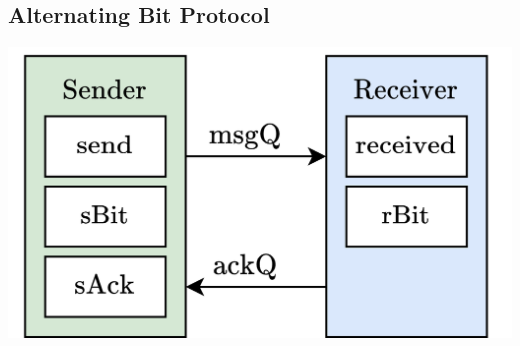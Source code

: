 \subsection{Alternating Bit Protocol}
\begin{center}
    \includegraphics[width=.4\textwidth]{linear_time_logic/images/alt_bit_protocol.drawio.png}
\end{center}
\unfinished
% 
